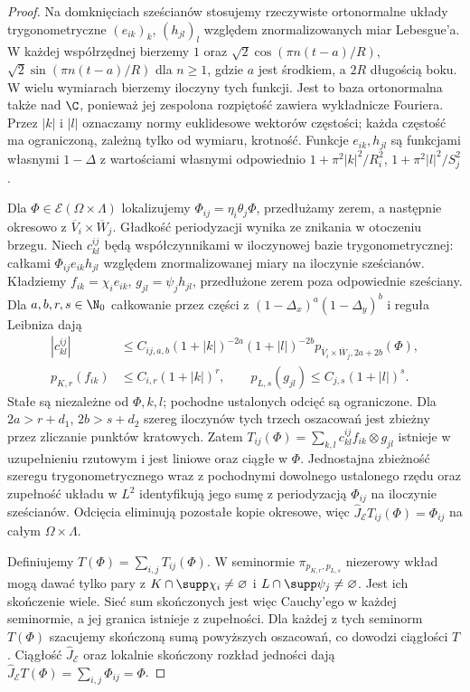 \begin{proof}
Na domknięciach sześcianów stosujemy rzeczywiste
ortonormalne układy trygonometryczne $(e_{ik})_k$,
$(h_{jl})_l$ względem znormalizowanych miar Lebesgue'a.
W każdej współrzędnej bierzemy $1$ oraz
$\sqrt2\cos(\pi n(t-a)/R)$, $\sqrt2\sin(\pi n(t-a)/R)$
dla $n\ge1$, gdzie $a$ jest środkiem, a $2R$ długością
boku. W wielu wymiarach bierzemy iloczyny tych funkcji.
Jest to baza ortonormalna także nad $\C$, ponieważ
jej zespolona rozpiętość zawiera wykładnicze Fouriera.
Przez $|k|$ i $|l|$ oznaczamy normy euklidesowe
wektorów częstości; każda częstość ma ograniczoną,
zależną tylko od wymiaru, krotność.
Funkcje $e_{ik},h_{jl}$ są funkcjami własnymi
$1-\Delta$ z wartościami własnymi odpowiednio
$1+\pi^2|k|^2/R_i^2$, $1+\pi^2|l|^2/S_j^2$.

Dla $\Phi\in\mathcal E(\Omega\times\Lambda)$
lokalizujemy $\Phi_{ij}=\eta_i\theta_j\Phi$,
przedłużamy zerem, a następnie okresowo z
$\overline V_i\times\overline W_j$.
Gładkość periodyzacji wynika ze znikania w otoczeniu
brzegu. Niech $c_{kl}^{ij}$ będą współczynnikami
w iloczynowej bazie trygonometrycznej: całkami
$\Phi_{ij}e_{ik}h_{jl}$ względem znormalizowanej
miary na iloczynie sześcianów. Kładziemy
$f_{ik}=\chi_i e_{ik}$, $g_{jl}=\psi_j h_{jl}$,
przedłużone zerem poza odpowiednie sześciany.
Dla $a,b,r,s\in\N_0$ całkowanie przez części z
$(1-\Delta_x)^a(1-\Delta_y)^b$ i reguła Leibniza dają
\[
 \begin{aligned}
 |c_{kl}^{ij}|&\le C_{ij,a,b}(1+|k|)^{-2a}
 (1+|l|)^{-2b}
 p_{\overline V_i\times\overline W_j,2a+2b}(\Phi),\\
 p_{K,r}(f_{ik})&\le C_{i,r}(1+|k|)^r,\qquad
 p_{L,s}(g_{jl})\le C_{j,s}(1+|l|)^s.
 \end{aligned}
\]
Stałe są niezależne od $\Phi,k,l$; pochodne ustalonych
odcięć są ograniczone. Dla $2a>r+d_1$, $2b>s+d_2$
szereg iloczynów tych trzech oszacowań jest zbieżny
przez zliczanie punktów kratowych.
Zatem
$T_{ij}(\Phi)=\sum_{k,l}c_{kl}^{ij}f_{ik}\otimes g_{jl}$
istnieje w uzupełnieniu rzutowym i jest liniowe
oraz ciągłe w $\Phi$.
Jednostajna zbieżność szeregu trygonometrycznego
wraz z pochodnymi dowolnego ustalonego rzędu oraz
zupełność układu w $L^2$ identyfikują jego sumę
z periodyzacją $\Phi_{ij}$ na iloczynie sześcianów.
Odcięcia eliminują pozostałe kopie okresowe, więc
$\widehat J_{\mathcal E}T_{ij}(\Phi)=\Phi_{ij}$
na całym $\Omega\times\Lambda$.

Definiujemy $T(\Phi)=\sum_{i,j}T_{ij}(\Phi)$.
W seminormie $\pi_{p_{K,r},p_{L,s}}$ niezerowy wkład
mogą dawać tylko pary z
$K\cap\supp\chi_i\ne\varnothing$ i
$L\cap\supp\psi_j\ne\varnothing$.
Jest ich skończenie wiele. Sieć sum skończonych
jest więc Cauchy'ego w każdej seminormie, a jej
granica istnieje z zupełności.
Dla każdej z tych seminorm $T(\Phi)$ szacujemy
skończoną sumą powyższych oszacowań, co dowodzi
ciągłości $T$. Ciągłość $\widehat J_{\mathcal E}$
oraz lokalnie skończony rozkład jedności dają
$\widehat J_{\mathcal E}T(\Phi)=\sum_{i,j}\Phi_{ij}=\Phi$.


\end{proof}
